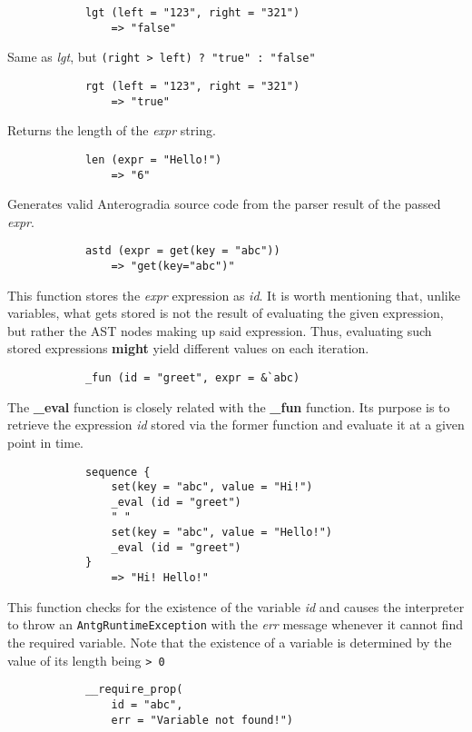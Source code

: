 \begin{multicols*}{2}
\begin{verbatim}
			lgt (left = "123", right = "321")
			    => "false"
    \end{verbatim}
    Same as \textit{lgt}, but \verb|(right > left) ? "true" : "false"|
    \begin{verbatim}
			rgt (left = "123", right = "321")
			    => "true"
    \end{verbatim}
    Returns the length of the \textit{expr} string.
    \begin{verbatim}
			len (expr = "Hello!")
			    => "6"
    \end{verbatim}
    \columnbreak
    Generates valid Anterogradia source code from the parser result of the passed \textit{expr}.
    \begin{verbatim}
			astd (expr = get(key = "abc"))
			    => "get(key="abc")"
    \end{verbatim}
    \spacing
    This function stores the \textit{expr} expression as \textit{id}. It is worth mentioning that, unlike variables,
    what gets stored is not the result of evaluating the given expression, but rather the AST nodes making up said expression.
    Thus, evaluating such stored expressions \textbf{might} yield different values on each iteration.
    \begin{verbatim}
			_fun (id = "greet", expr = &`abc)
    \end{verbatim}
    \spacing
    The \textbf{\_eval} function is closely related with the \textbf{\_fun} function. Its purpose is to retrieve the expression \textit{id} stored via the
    former function and evaluate it at a given point in time.
    \begin{verbatim}
			sequence {
			    set(key = "abc", value = "Hi!")
			    _eval (id = "greet")
			    " "
			    set(key = "abc", value = "Hello!")
			    _eval (id = "greet")
			}
			    => "Hi! Hello!"
    \end{verbatim}
    This function checks for the existence of the variable \textit{id} and causes the interpreter to throw an \verb|AntgRuntimeException|
    with the \textit{err} message whenever it cannot find the required variable. Note that the existence of a variable is determined by the
    value of its length being \verb|> 0|
    \begin{verbatim}
			__require_prop(
			    id = "abc",
			    err = "Variable not found!")


\end{verbatim}
\end{multicols*}
